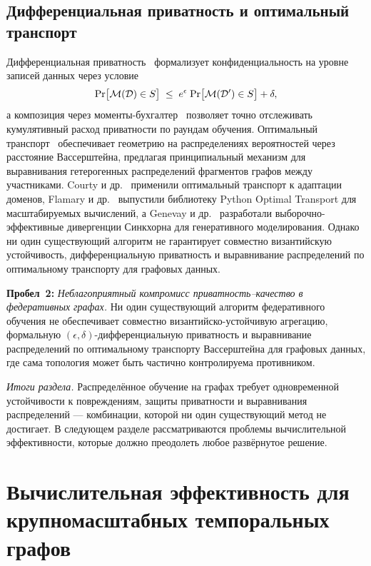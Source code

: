 \subsection{Дифференциальная приватность и оптимальный транспорт}

Дифференциальная приватность~\cite{Dwork2006} формализует конфиденциальность на уровне записей данных через условие
\begin{equation}
\mathrm{Pr}\bigl[\mathcal{M}(\mathcal{D})\in S\bigr]
\;\le\;
e^{\epsilon}\;\mathrm{Pr}\bigl[\mathcal{M}(\mathcal{D}')\in S\bigr] + \delta,
\end{equation}
а композиция через моменты-бухгалтер~\cite{Abadi2016} позволяет точно отслеживать кумулятивный расход приватности по раундам обучения. Оптимальный транспорт~\cite{Villani2009,Cuturi2013} обеспечивает геометрию на распределениях вероятностей через расстояние Вассерштейна, предлагая принципиальный механизм для выравнивания гетерогенных распределений фрагментов графов между участниками. Courty и др.~\cite{Courty2017} применили оптимальный транспорт к адаптации доменов, Flamary и др.~\cite{Flamary2021pot} выпустили библиотеку Python Optimal Transport для масштабируемых вычислений, а Genevay и др.~\cite{Genevay2018} разработали выборочно-эффективные дивергенции Синкхорна для генеративного моделирования. Однако ни один существующий алгоритм не гарантирует совместно византийскую устойчивость, дифференциальную приватность и выравнивание распределений по оптимальному транспорту для графовых данных.

\medskip
\noindent\textbf{Пробел~2:} \emph{Неблагоприятный компромисс приватность--качество в федеративных графах.} Ни один существующий алгоритм федеративного обучения не обеспечивает совместно византийско-устойчивую агрегацию, формальную $(\epsilon,\delta)$-дифференциальную приватность и выравнивание распределений по оптимальному транспорту Вассерштейна для графовых данных, где сама топология может быть частично контролируема противником.

\medskip
\noindent\textit{Итоги раздела.} Распределённое обучение на графах требует одновременной устойчивости к повреждениям, защиты приватности и выравнивания распределений --- комбинации, которой ни один существующий метод не достигает. В следующем разделе рассматриваются проблемы вычислительной эффективности, которые должно преодолеть любое развёрнутое решение.


\section{Вычислительная эффективность для крупномасштабных темпоральных графов}
\label{sec:efficiency}

